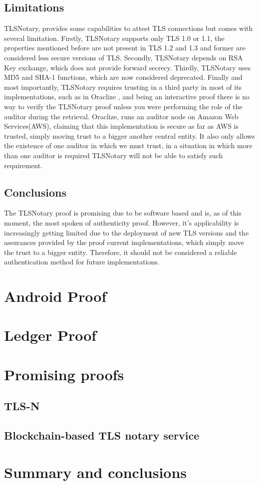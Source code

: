 \subsection{Limitations}
TLSNotary, provides some capabilities to attest TLS connections but comes with several limitation. Firstly, TLSNotary supports only TLS 1.0 or 1.1, the properties mentioned before are not present in TLS 1.2 and 1.3 and former are considered less secure versions of TLS. Secondly, TLSNotary depends on RSA Key exchange, which does not provide forward secrecy. Thirdly, TLSNotary uses MD5 and SHA-1 functions, which are now considered deprecated. Finally and most importantly, TLSNotary requires trusting in a third party in most of its implementations, such as in Oraclize \cite{Oraclize.it2018OraclizeDocumentation}, and being an interactive proof there is no way to verify the TLSNotary proof unless you were performing the role of the auditor during the retrieval. Oraclize, runs an auditor node on Amazon Web Services(AWS), claiming that this implementation is secure as far as AWS is trusted, simply moving trust to a bigger another central entity. It also only allows the existence of one auditor in which we must trust, in a situation in which more than one auditor is required TLSNotary will not be able to satisfy such requirement.


\subsection{Conclusions}
The TLSNotary proof is promising due to be software based and is, as of this moment, the most spoken of authenticity proof. However, it's applicability is increasingly getting limited due to the deployment of new TLS versions and the assurances provided by the proof current implementations, which simply move the trust to a bigger entity. Therefore, it should not be considered a reliable authentication method for future implementations.

\section{Android Proof}


\section{Ledger Proof}

\section{Promising proofs}

\subsection{TLS-N}

\subsection{Blockchain-based TLS notary service}

\section{Summary and conclusions}

